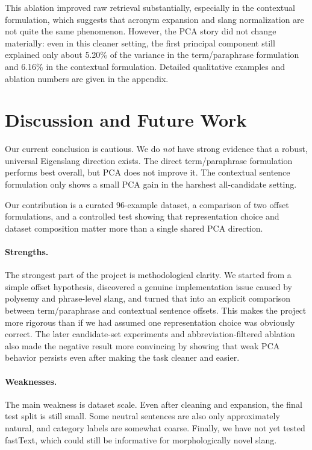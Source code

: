 \documentclass{article}
\begin{document}
This ablation improved raw retrieval substantially, especially in the contextual formulation, which suggests that acronym expansion and slang normalization are not quite the same phenomenon.
However, the PCA story did not change materially: even in this cleaner setting, the first principal component still explained only about 5.20\% of the variance in the term/paraphrase formulation and 6.16\% in the contextual formulation.
Detailed qualitative examples and ablation numbers are given in the appendix.

\section{Discussion and Future Work}\label{sec:discussion}
Our current conclusion is cautious.
We do \emph{not} have strong evidence that a robust, universal Eigenslang direction exists.
The direct term/paraphrase formulation performs best overall, but PCA does not improve it.
The contextual sentence formulation only shows a small PCA gain in the harshest all-candidate setting.

Our contribution is a curated 96-example dataset, a comparison of two offset formulations, and a controlled test showing that representation choice and dataset composition matter more than a single shared PCA direction.

\paragraph{Strengths.}
The strongest part of the project is methodological clarity.
We started from a simple offset hypothesis, discovered a genuine implementation issue caused by polysemy and phrase-level slang, and turned that into an explicit comparison between term/paraphrase and contextual sentence offsets.
This makes the project more rigorous than if we had assumed one representation choice was obviously correct.
The later candidate-set experiments and abbreviation-filtered ablation also made the negative result more convincing by showing that weak PCA behavior persists even after making the task cleaner and easier.

\paragraph{Weaknesses.}
The main weakness is dataset scale.
Even after cleaning and expansion, the final test split is still small.
Some neutral sentences are also only approximately natural, and category labels are somewhat coarse.
Finally, we have not yet tested fastText, which could still be informative for morphologically novel slang.
\end{document}
